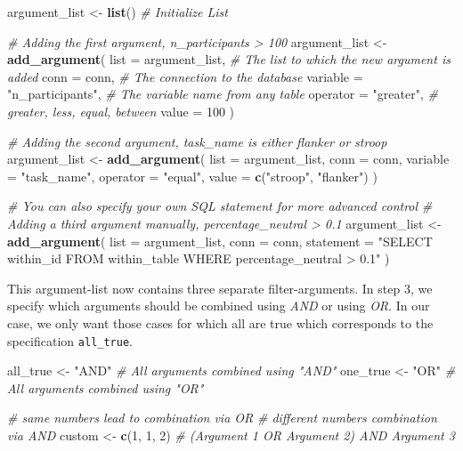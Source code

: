 \documentclass[
  man,floatsintext]{apa6}
\newenvironment{Shaded}{\begin{snugshade}}{\end{snugshade}}
\newcommand{\AttributeTok}[1]{\textcolor[rgb]{0.13,0.29,0.53}{#1}}
\newcommand{\CommentTok}[1]{\textcolor[rgb]{0.56,0.35,0.01}{\textit{#1}}}
\newcommand{\DecValTok}[1]{\textcolor[rgb]{0.00,0.00,0.81}{#1}}
\newcommand{\FunctionTok}[1]{\textcolor[rgb]{0.13,0.29,0.53}{\textbf{#1}}}
\newcommand{\NormalTok}[1]{#1}
\newcommand{\OtherTok}[1]{\textcolor[rgb]{0.56,0.35,0.01}{#1}}
\newcommand{\StringTok}[1]{\textcolor[rgb]{0.31,0.60,0.02}{#1}}
\begin{document}
\begin{Shaded}
\begin{Highlighting}[]
\NormalTok{argument\_list }\OtherTok{\textless{}{-}} \FunctionTok{list}\NormalTok{() }\CommentTok{\# Initialize List}

\CommentTok{\# Adding the first argument, n\_participants \textgreater{} 100}
\NormalTok{argument\_list }\OtherTok{\textless{}{-}} \FunctionTok{add\_argument}\NormalTok{(}
  \AttributeTok{list =}\NormalTok{ argument\_list, }\CommentTok{\# The list to which the new argument is added}
  \AttributeTok{conn =}\NormalTok{ conn, }\CommentTok{\# The connection to the database}
  \AttributeTok{variable =} \StringTok{"n\_participants"}\NormalTok{, }\CommentTok{\# The variable name from any table}
  \AttributeTok{operator =} \StringTok{"greater"}\NormalTok{, }\CommentTok{\# greater, less, equal, between}
  \AttributeTok{value =} \DecValTok{100} 
\NormalTok{)}

\CommentTok{\# Adding the second argument, task\_name is either flanker or stroop}
\NormalTok{argument\_list }\OtherTok{\textless{}{-}} \FunctionTok{add\_argument}\NormalTok{(}
  \AttributeTok{list =}\NormalTok{ argument\_list,}
  \AttributeTok{conn =}\NormalTok{ conn,}
  \AttributeTok{variable =} \StringTok{"task\_name"}\NormalTok{,}
  \AttributeTok{operator =} \StringTok{"equal"}\NormalTok{,}
  \AttributeTok{value =} \FunctionTok{c}\NormalTok{(}\StringTok{"stroop"}\NormalTok{, }\StringTok{"flanker"}\NormalTok{)}
\NormalTok{)}

\CommentTok{\# You can also specify your own SQL statement for more advanced control}
\CommentTok{\# Adding a third argument manually, percentage\_neutral \textgreater{} 0.1}
\NormalTok{argument\_list }\OtherTok{\textless{}{-}} \FunctionTok{add\_argument}\NormalTok{(}
  \AttributeTok{list =}\NormalTok{ argument\_list,}
  \AttributeTok{conn =}\NormalTok{ conn,}
  \AttributeTok{statement =} \StringTok{"SELECT within\_id FROM within\_table WHERE percentage\_neutral \textgreater{} 0.1"}
\NormalTok{)}
\end{Highlighting}
\end{Shaded}

This argument-list now contains three separate filter-arguments. In step 3, we specify which arguments should be combined using \emph{AND} or using \emph{OR}. In our case, we only want those cases for which all are true which corresponds to the specification \texttt{all\_true}.

\begin{Shaded}
\begin{Highlighting}[]
\NormalTok{all\_true }\OtherTok{\textless{}{-}} \StringTok{"AND"} \CommentTok{\# All arguments combined using "AND"}
\NormalTok{one\_true }\OtherTok{\textless{}{-}} \StringTok{"OR"} \CommentTok{\# All arguments combined using "OR"}

\CommentTok{\# same numbers lead to combination via OR}
\CommentTok{\# different numbers combination via AND}
\NormalTok{custom }\OtherTok{\textless{}{-}} \FunctionTok{c}\NormalTok{(}\DecValTok{1}\NormalTok{, }\DecValTok{1}\NormalTok{, }\DecValTok{2}\NormalTok{) }\CommentTok{\# (Argument 1 OR Argument 2) AND Argument 3}
\end{Highlighting}
\end{Shaded}
\end{document}
